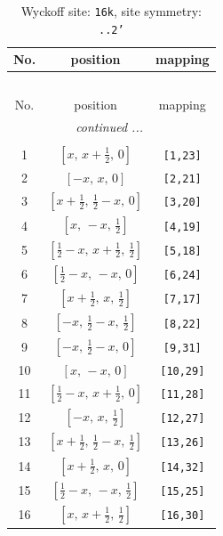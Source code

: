 \documentclass[fleqn,8pt]{jsarticle}
\begin{document}
\begin{longtable}{ccc}
\caption{Wyckoff site: {\tt 16k}, site symmetry: {\tt ..2'}}
 \\
 \hline \hline
No. & position & mapping \\ \hline \endfirsthead

\multicolumn{2}{l}{\tablename\ \thetable{}} \\
 \hline \hline
No. & position & mapping \\ \hline \endhead

 \hline \hline
\multicolumn{2}{r}{\footnotesize\it continued ...} \\ \endfoot

 \hline \hline
\multicolumn{2}{r}{} \\ \endlastfoot

1 & $\left[ x,\, x + \frac{1}{2},\, 0 \right]$ & {\tt [1,23]} \\ \hline
2 & $\left[ - x,\, x,\, 0 \right]$ & {\tt [2,21]} \\ \hline
3 & $\left[ x + \frac{1}{2},\, \frac{1}{2} - x,\, 0 \right]$ & {\tt [3,20]} \\ \hline
4 & $\left[ x,\, - x,\, \frac{1}{2} \right]$ & {\tt [4,19]} \\ \hline
5 & $\left[ \frac{1}{2} - x,\, x + \frac{1}{2},\, \frac{1}{2} \right]$ & {\tt [5,18]} \\ \hline
6 & $\left[ \frac{1}{2} - x,\, - x,\, 0 \right]$ & {\tt [6,24]} \\ \hline
7 & $\left[ x + \frac{1}{2},\, x,\, \frac{1}{2} \right]$ & {\tt [7,17]} \\ \hline
8 & $\left[ - x,\, \frac{1}{2} - x,\, \frac{1}{2} \right]$ & {\tt [8,22]} \\ \hline
9 & $\left[ - x,\, \frac{1}{2} - x,\, 0 \right]$ & {\tt [9,31]} \\ \hline
10 & $\left[ x,\, - x,\, 0 \right]$ & {\tt [10,29]} \\ \hline
11 & $\left[ \frac{1}{2} - x,\, x + \frac{1}{2},\, 0 \right]$ & {\tt [11,28]} \\ \hline
12 & $\left[ - x,\, x,\, \frac{1}{2} \right]$ & {\tt [12,27]} \\ \hline
13 & $\left[ x + \frac{1}{2},\, \frac{1}{2} - x,\, \frac{1}{2} \right]$ & {\tt [13,26]} \\ \hline
14 & $\left[ x + \frac{1}{2},\, x,\, 0 \right]$ & {\tt [14,32]} \\ \hline
15 & $\left[ \frac{1}{2} - x,\, - x,\, \frac{1}{2} \right]$ & {\tt [15,25]} \\ \hline
16 & $\left[ x,\, x + \frac{1}{2},\, \frac{1}{2} \right]$ & {\tt [16,30]} \\
\end{longtable}
\end{document}
